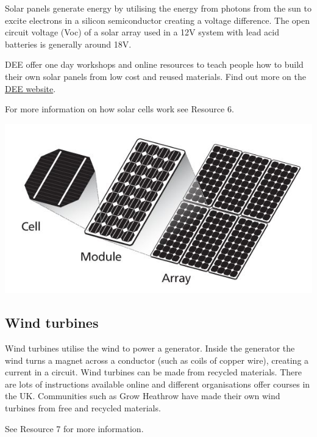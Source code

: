 \documentclass{article}
\theoremstyle{definition}
\theoremstyle{definition}
\theoremstyle{remark}
\begin{document}
    Solar panels generate energy by utilising the energy from photons from the sun to excite electrons in a silicon semiconductor creating a voltage difference. The open circuit voltage (Voc) of a solar array used in a 12V system with lead acid batteries is generally around 18V. 

    DEE offer one day workshops and online resources to teach people how to build their own solar panels from low cost and reused materials. Find out more on the \href{http://www.demandenergyequality.org/}{DEE website}.

    For more information on how solar cells work see Resource 6.
    
    \begin{center}
      \includegraphics[width=0.45\paperwidth]{Images/image_4_1_(solar_breakdown).png}
    \end{center}
  

  {\color{blue}\subsection{Wind turbines}} %
  \label{sub:wind_turbines}

    Wind turbines utilise the wind to power a generator. Inside the generator the wind turns a magnet across a conductor (such as coils of copper wire), creating a current in a circuit. Wind turbines can be made from recycled materials. There are lots of instructions available online and different organisations offer courses in the UK. Communities such as Grow Heathrow have made their own wind turbines from free and recycled materials.

    See Resource 7 for more information.
  
\end{document}
